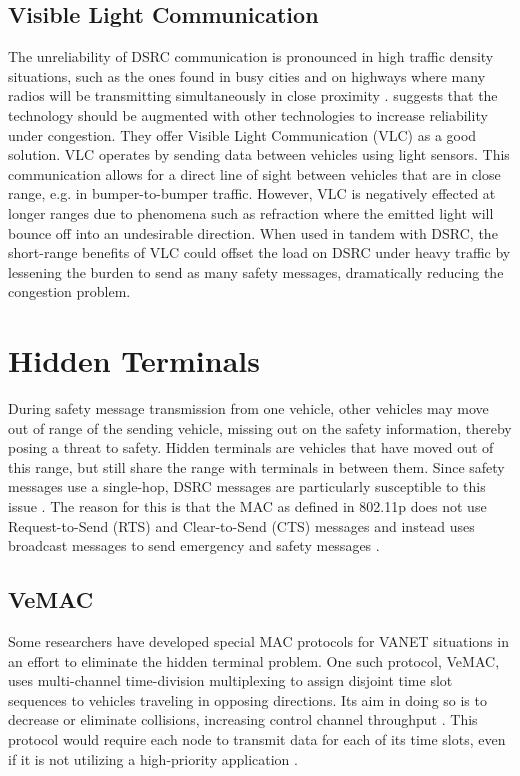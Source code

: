 \documentclass[twoside,conference]{IEEEtran}
\begin{document}
	\subsection{Visible Light Communication}\label{sec:visiblelightcommunication}
		The unreliability of DSRC communication is pronounced in high traffic density situations, such as the ones found in busy cities and on highways where many radios will be transmitting simultaneously in close proximity \cite{Cailean2014}. \cite{Cailean2014} suggests that the technology should be augmented with other technologies to increase reliability under congestion. They offer Visible Light Communication (VLC) as a good solution. VLC operates by sending data between vehicles using light sensors. This communication allows for a direct line of sight between vehicles that are in close range, e.g. in bumper-to-bumper traffic. However, VLC is negatively effected at longer ranges due to phenomena such as refraction where the emitted light will bounce off into an undesirable direction. When used in tandem with DSRC, the short-range benefits of VLC could offset the load on DSRC under heavy traffic by lessening the burden to send as many safety messages, dramatically reducing the congestion problem.

\section{Hidden Terminals}\label{sec:hiddenterminal}
		During safety message transmission from one vehicle, other vehicles may move out of range of the sending vehicle, missing out on the safety information, thereby posing a threat to safety. Hidden terminals are vehicles that have moved out of this range, but still share the range with terminals in between them. Since safety messages use a single-hop, DSRC messages are particularly susceptible to this issue \cite{Ma2009}.  The reason for this is that the MAC as defined in 802.11p does not use Request-to-Send (RTS) and Clear-to-Send (CTS) messages and instead uses broadcast messages to send emergency and safety messages \cite[p. 969]{Rahman2014}. 
		
		\subsection{VeMAC}\label{sec:vemac}
			Some researchers have developed special MAC protocols for VANET situations in an effort to eliminate the hidden terminal problem. One such protocol, VeMAC, uses multi-channel time-division multiplexing to assign disjoint time slot sequences to vehicles traveling in opposing directions. Its aim in doing so is to decrease or eliminate collisions, increasing control channel throughput \cite{Omar2013}. This protocol would require each node to transmit data for each of its time slots, even if it is not utilizing a high-priority application \cite{Kolte2014}. 
		
\end{document}
